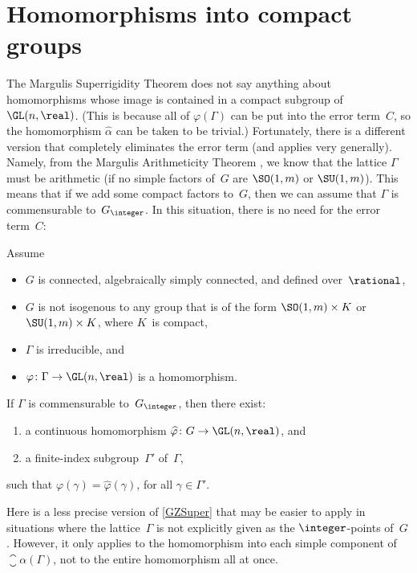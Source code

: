 \section{Homomorphisms into compact groups} \label{SuperCpctSect}

The Margulis Superrigidity Theorem  does not say anything about homomorphisms whose image is contained in a compact subgroup of $\GL(n,\real)$. (This is because all of $\varphi(\Gamma)$ can be put into the error term~$C$, so the homomorphism $\widehat\alpha$ can be taken to be trivial.) Fortunately, there is a different version that completely eliminates the error term (and applies very generally). Namely, from the Margulis Arithmeticity Theorem , we know that the lattice $\Gamma$ must be arithmetic (if no simple factors of~$G$ are $\SO(1,m)$ or $\SU(1,m)$). This means that if we add some compact factors to~$G$, then we can assume that $\Gamma$ is commensurable to~$G_{\integer}$. In this situation, there is no need for the error term~$C$:

\begin{cor} \label{GZSuper}
Assume
\noprelistbreak
	\begin{itemize}
	\item $G$ is connected, algebraically simply connected, and defined over~$\rational$,
	\item $G$ is not isogenous to any group that is of the form\/ $\SO(1,m) \times K$ or\/ $\SU(1,m) \times K$, where $K$~is compact,
	\item $\Gamma$ is irreducible,
	and
	\item $\varphi \colon \Gamma \to \GL(n,\real)$ is a homomorphism.
	\end{itemize}
If\/ $\Gamma$ is commensurable to~$G_{\integer}$, then there exist:
\noprelistbreak
	\begin{enumerate}
	\item a continuous homomorphism $\widehat\varphi \colon G \to \GL(n,\real)$,
	and
	\item a finite-index subgroup\/~$\Gamma'$ of\/~$\Gamma$,
	\end{enumerate}
such that $\varphi(\gamma) = \widehat\varphi(\gamma)$, for all $\gamma \in \Gamma'$.
\end{cor}

Here is a less precise version of \cref{GZSuper} that may be easier to apply in situations where the lattice~$\Gamma$ is not explicitly given as the $\integer$-points of~$G$.  
However, it only applies to the homomorphism into each simple component of $\closure{\alpha(\Gamma)}$, not to the entire homomorphism all at once.

